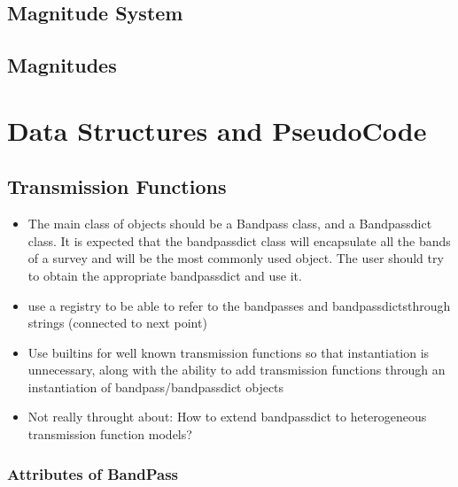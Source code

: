 \documentclass{article}[12pt]
\begin{document}
\subsection{Magnitude System}

\subsection{Magnitudes}

\section{Data Structures and PseudoCode}

\subsection{Transmission Functions} 
\begin{itemize}
    \item The main class of objects should be a Bandpass class, and a Bandpassdict class. It is expected that the bandpassdict class will encapsulate all the bands of a survey and will be the most commonly used object. The user should try to obtain the appropriate bandpassdict and use it.
    \item use a registry to be able to refer to the bandpasses and bandpassdictsthrough strings (connected to next point)
    \item Use builtins for well known transmission functions so that instantiation is unnecessary, along with the ability to add transmission functions through an instantiation of bandpass/bandpassdict objects
    \item Not really throught about: How to extend bandpassdict to heterogeneous transmission function models?
\end{itemize}
\subsubsection{Attributes of BandPass}
\end{document}
